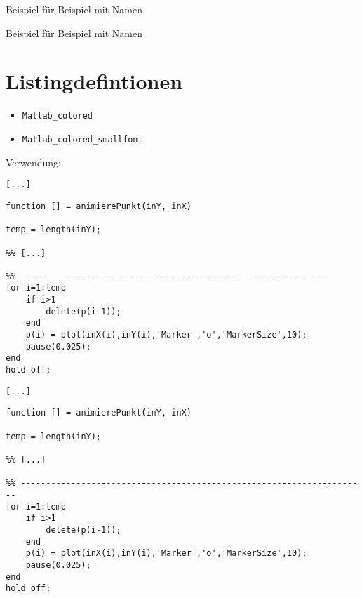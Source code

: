 \begin{verbatimtab}
\begin{example}[Test]
	Beispiel für Beispiel mit \glqq{}Namen\grqq{}
\end{example}
\end{verbatimtab}
\begin{example}[Test]
	Beispiel für Beispiel mit \glqq{}Namen\grqq{}
\end{example}


\section*{Listingdefintionen}
\begin{itemize}
	\item \verb|Matlab_colored|
	\item \verb|Matlab_colored_smallfont|
\end{itemize}

\noindent Verwendung:
\begin{verbatimtab}
\begin{lstlisting}[style=Matlab_colored, %
			caption = {Beispiellisting, style=Matlab\_colored}, %
			label={lst:Listing1}]
	[...]
\end{lstlisting}
\end{verbatimtab}

\begin{lstlisting}[style=Matlab_colored, caption = {Beispiellisting, style=Matlab\_colored}, label={lst:Listing1}]
function [] = animierePunkt(inY, inX)

temp = length(inY);

%% [...]

%% -------------------------------------------------------------
for i=1:temp
    if i>1
        delete(p(i-1));
    end
    p(i) = plot(inX(i),inY(i),'Marker','o','MarkerSize',10);
    pause(0.025);
end
hold off;
\end{lstlisting}

\begin{verbatimtab}
\begin{lstlisting}[style=Matlab_colored_smallfont, %
			caption = {Beispiellisting, style=Matlab\_colored\_smallfont}, %
			label={lst:Listing2}]
	[...]
\end{lstlisting}
\end{verbatimtab}

\begin{lstlisting}[style=Matlab_colored_smallfont, caption = {Beispiellisting, style=Matlab\_colored\_smallfont}, label={lst:Listing2}]
function [] = animierePunkt(inY, inX)

temp = length(inY);

%% [...]

%% ---------------------------------------------------------------------
for i=1:temp
    if i>1
        delete(p(i-1));
    end
    p(i) = plot(inX(i),inY(i),'Marker','o','MarkerSize',10);
    pause(0.025);
end
hold off;
\end{lstlisting}

